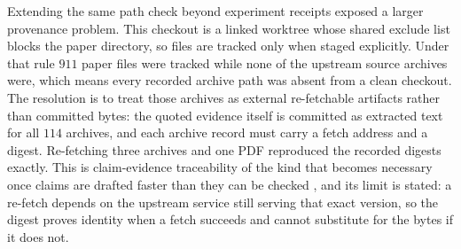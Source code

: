 \documentclass[11pt,a4paper]{article}
\begin{document}
Extending the same path check beyond experiment receipts exposed a larger provenance
problem. This checkout is a linked worktree whose shared exclude list blocks the paper
directory, so files are tracked only when staged explicitly. Under that rule $911$ paper
files were tracked while none of the upstream source archives were, which means every
recorded archive path was absent from a clean checkout. The resolution is to treat those
archives as external re-fetchable artifacts rather than committed bytes: the quoted
evidence itself is committed as extracted text for all $114$ archives, and each archive
record must carry a fetch address and a digest. Re-fetching three archives and one PDF
reproduced the recorded digests exactly. This is claim-evidence traceability of the kind
that becomes necessary once claims are drafted faster than they can be checked
\citep{evidenceledger2026}, and its limit is stated: a re-fetch depends on the upstream
service still serving that exact version, so the digest proves identity when a fetch
succeeds and cannot substitute for the bytes if it does not.
\end{document}

